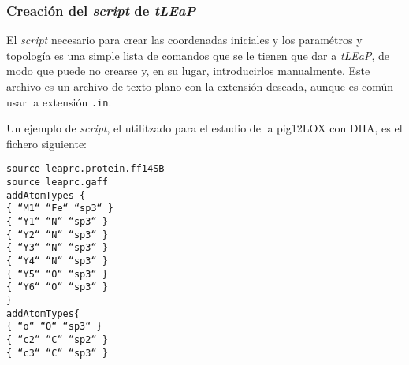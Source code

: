         \subsubsection{Creación del \textit{script} de \textit{tLEaP}}
            El \textit{script} necesario para crear las coordenadas iniciales y los paramétros y topología es una simple lista de comandos que se le tienen que dar a \textit{tLEaP}, de modo que puede no crearse y, en su lugar, introducirlos manualmente. Este archivo es un archivo de texto plano con la extensión deseada, aunque es común usar la extensión \texttt{.in}.\par
            \textsf{Un ejemplo de \textit{script}, el utilitzado para el estudio de la pig12LOX con DHA, es el fichero siguiente:}
            \begin{adjustwidth}{1.0cm}{}
            \texttt{source leaprc.protein.ff14SB\\
                source leaprc.gaff\\
                addAtomTypes \{\\
	            \hspace{0.5cm}    \{ ``M1`` ``Fe`` ``sp3`` \}\\
                \hspace{0.5cm}    \{ ``Y1`` ``N``  ``sp3`` \}\\ 
                \hspace{0.5cm}    \{ ``Y2`` ``N``  ``sp3`` \}\\
                \hspace{0.5cm}    \{ ``Y3`` ``N``  ``sp3`` \}\\
                \hspace{0.5cm}    \{ ``Y4`` ``N``  ``sp3`` \}\\
                \hspace{0.5cm}    \{ ``Y5`` ``O``  ``sp3`` \}\\
                \hspace{0.5cm}    \{ ``Y6`` ``O``  ``sp3`` \}\\
                \}\\
                addAtomTypes\{\\
                \hspace{0.5cm}    \{ ``o``  ``O``  ``sp3`` \}\\
                \hspace{0.5cm}    \{ ``c2`` ``C``  ``sp2`` \}\\
                \hspace{0.5cm}    \{ ``c3`` ``C``  ``sp3`` \}\\
}
\end{adjustwidth}
